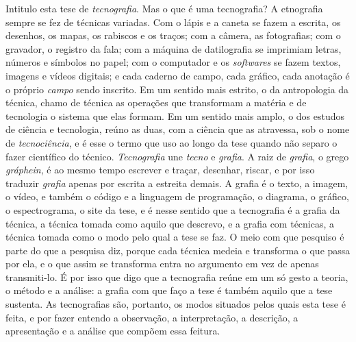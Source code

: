 Intitulo esta tese de \textit{tecnografia}. Mas o que é uma tecnografia? A etnografia sempre se fez de técnicas variadas. Com o lápis e a caneta se fazem a escrita, os desenhos, os mapas, os rabiscos e os traços; com a câmera, as fotografias; com o gravador, o registro da fala; com a máquina de datilografia se imprimiam letras, números e símbolos no papel; com o computador e os \textit{softwares} se fazem textos, imagens e vídeos digitais; e cada caderno de campo, cada gráfico, cada anotação é o próprio \textit{campo} sendo inscrito. Em um sentido mais estrito, o da antropologia da técnica, chamo de técnica as operações que transformam a matéria e de tecnologia o sistema que elas formam. Em um sentido mais amplo, o dos estudos de ciência e tecnologia, reúno as duas, com a ciência que as atravessa, sob o nome de \textit{tecnociência}, e é esse o termo que uso ao longo da tese quando não separo o fazer científico do técnico. \textit{Tecnografia} une \textit{tecno} e \textit{grafia}. A raiz de \textit{grafia}, o grego \textit{gráphein}, é ao mesmo tempo escrever e traçar, desenhar, riscar, e por isso traduzir \textit{grafia} apenas por escrita a estreita demais. A grafia é o texto, a imagem, o vídeo, e também o código e a linguagem de programação, o diagrama, o gráfico, o espectrograma, o site da tese, e é nesse sentido que a tecnografia é a grafia da técnica, a técnica tomada como aquilo que descrevo, e a grafia com técnicas, a técnica tomada como o modo pelo qual a tese se faz. O meio com que pesquiso é parte do que a pesquisa diz, porque cada técnica medeia e transforma o que passa por ela, e o que assim se transforma entra no argumento em vez de apenas transmiti-lo. É por isso que digo que a tecnografia reúne em um só gesto a teoria, o método e a análise: a grafia com que faço a tese é também aquilo que a tese sustenta. As tecnografias são, portanto, os modos situados pelos quais esta tese é feita, e por fazer entendo a observação, a interpretação, a descrição, a apresentação e a análise que compõem essa feitura.

